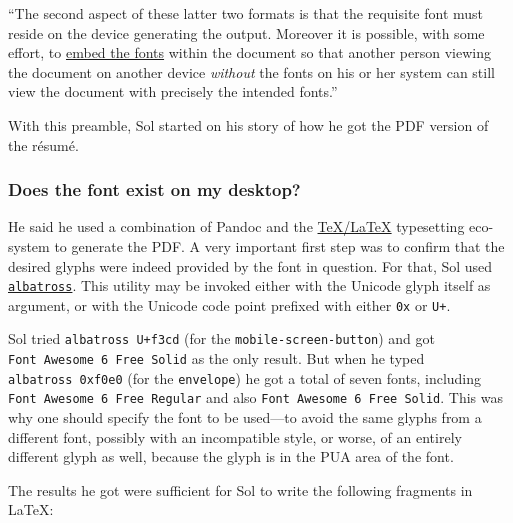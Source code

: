 \documentclass[
  british,
  a4paper,
  rgb,
  dvipsnames,
  svgnames,
  hyphens]{article}
\begin{document}
``The second aspect of these latter two formats is that the requisite
font must reside on the device generating the output. Moreover it is
possible, with some effort, to
\href{https://en.wikipedia.org/wiki/Font_embedding}{embed the fonts}
within the document so that another person viewing the document on
another device \emph{without} the fonts on his or her system can still
view the document with precisely the intended fonts.''

With this preamble, Sol started on his story of how he got the PDF
version of the résumé.

\hypertarget{does-the-font-exist-on-my-desktop}{%
\subsubsection{Does the font exist on my
desktop?}\label{does-the-font-exist-on-my-desktop}}

He said he used a combination of Pandoc and the
\href{https://www.tug.org/begin.html}{TeX/LaTeX} typesetting eco-system
to generate the PDF. A very important first step was to confirm that the
desired glyphs were indeed provided by the font in question. For that,
Sol used
\href{https://ctan.org/pkg/albatross?lang=en}{\texttt{albatross}}. This
utility may be invoked either with the Unicode glyph itself as argument,
or with the Unicode code point prefixed with either \texttt{0x} or
\texttt{U+}.

Sol tried \texttt{albatross\ U+f3cd} (for the
\texttt{mobile-screen-button}) and got
\texttt{Font\ Awesome\ 6\ Free\ Solid} as the only result. But when he
typed \texttt{albatross\ 0xf0e0} (for the \texttt{envelope}) he got a
total of seven fonts, including \texttt{Font\ Awesome\ 6\ Free\ Regular}
and also \texttt{Font\ Awesome\ 6\ Free\ Solid}. This was why one should
specify the font to be used---to avoid the same glyphs from a different
font, possibly with an incompatible style, or worse, of an entirely
different glyph as well, because the glyph is in the PUA area of the
font.

The results he got were sufficient for Sol to write the following
fragments in LaTeX:
\end{document}

